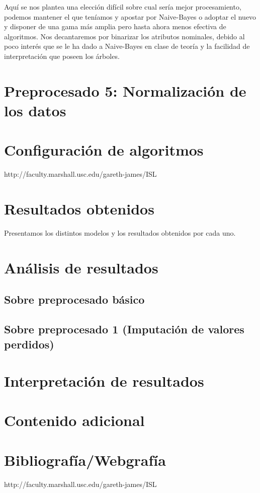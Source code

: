 \documentclass{article}
\begin{document}
Aquí se nos plantea una elección difícil sobre cual sería mejor
procesamiento, podemos mantener el que teníamos y apostar por
Naive-Bayes o adoptar el nuevo y disponer de una gama más amplia pero
hasta ahora menos efectiva de algoritmos. Nos decantaremos por
binarizar los atributos nominales, debido al poco interés que se le ha
dado a Naive-Bayes en clase de teoría y la facilidad de interpretación
que poseen los árboles.

\section{Preprocesado 5: Normalización de los datos}


\section{Configuración de algoritmos}

http://faculty.marshall.usc.edu/gareth-james/ISL

\section{Resultados obtenidos}

Presentamos los distintos modelos y los resultados obtenidos por cada
uno.

\section{Análisis de resultados} \label{sec:analisis}

\subsection{Sobre preprocesado básico}

\subsection{Sobre preprocesado 1 (Imputación de valores perdidos)}

\section{Interpretación de resultados}

\section{Contenido adicional}

\section{Bibliografía/Webgrafía}

http://faculty.marshall.usc.edu/gareth-james/ISL
\end{document}

